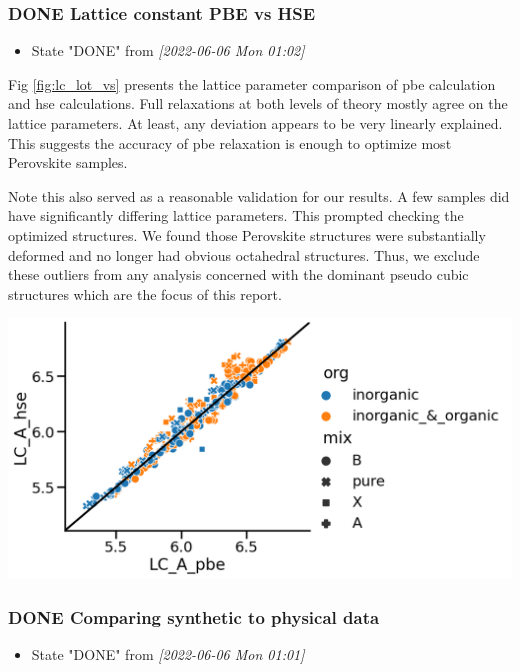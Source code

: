 \documentclass[twoside, twocolumn, 9pt, draft]{article}
\begin{document}
\subsubsection*{{\bfseries\sffamily DONE} Lattice constant PBE vs HSE}
\label{sec:org3adc69d}
\begin{itemize}
\item State "DONE"       from              \textit{[2022-06-06 Mon 01:02]}
\end{itemize}
Fig \ref{fig:lc_lot_vs} presents the lattice parameter comparison of
\acrshort{pbe} calculation and \acrshort{hse}
calculations. Full relaxations at both levels of theory mostly agree
on the lattice parameters. At least, any deviation appears to be very
linearly explained. This suggests the accuracy of
\acrshort{pbe} relaxation is enough to optimize most Perovskite
samples.

Note this also served as a reasonable validation for our results. A
few samples did have significantly differing lattice parameters. This
prompted checking the optimized structures. We found those Perovskite
structures were substantially deformed and no longer had obvious
octahedral structures. Thus, we exclude these outliers from any
analysis concerned with the dominant pseudo cubic structures which are
the focus of this report.

\begin{center}
\includegraphics[width=.9\linewidth]{pbe_v_hse_LC.png}
\end{center}

\subsubsection*{{\bfseries\sffamily DONE} Comparing synthetic to physical data}
\label{sec:orgdb2ac1c}
\begin{itemize}
\item State "DONE"       from              \textit{[2022-06-06 Mon 01:01]}
\end{itemize}
\end{document}
